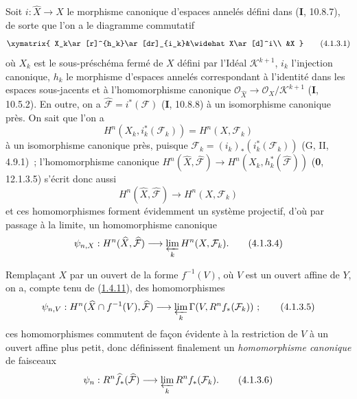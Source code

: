 \begin{env}[4.1.3]
\label{III.4.1.3-fr}
Soit $i:\widehat X\to X$ le morphisme canonique d'espaces annelés défini
dans (\textbf{I}, 10.8.7), de sorte que l'on a le diagramme commutatif
\[
\xymatrix{
X_k\ar[r]^{h_k}\ar[dr]_{i_k}&\widehat X\ar[d]^i\\
&X
}
\tag{4.1.3.1}\label{III.4.1.3.1-fr}
\]
où $X_k$ est le sous-préschéma fermé de $X$ défini par l'Idéal
$\mathcal K^{k+1}$, $i_k$ l'injection canonique, $h_k$ le morphisme
d'espaces annelés correspondant à l'identité dans les espaces sous-jacents
et à l'homomorphisme canonique
$\mathcal O_{\widehat X}\to\mathcal O_X/\mathcal K^{k+1}$ (\textbf{I}, 10.5.2).
En outre, on a $\widehat{\mathcal F}=i^*(\mathcal F)$ (\textbf{I}, 10.8.8) à un
isomorphisme canonique près. On sait que l'on a
\[
H^n(X_k,i_k^*(\mathcal F_k))=H^n(X,\mathcal F_k)
\tag{4.1.3.2}\label{III.4.1.3.2-fr}
\]
à un isomorphisme canonique près, puisque
$\mathcal F_k=(i_k)_*(i_k^*(\mathcal F_k))$ (G, II, 4.9.1)~;
l'homomorphisme canonique
$H^n(\widehat X,\widehat{\mathcal F})\to
H^n(X_k,h_k^*(\widehat{\mathcal F}))$ (\textbf{0}, 12.1.3.5) s'écrit donc aussi
\[
H^n(\widehat X,\widehat{\mathcal F})\longrightarrow H^n(X,\mathcal F_k)
\tag{4.1.3.3}\label{III.4.1.3.3-fr}
\]
et ces homomorphismes forment évidemment un système projectif, d'où par
passage à la limite, un homomorphisme canonique
\[
\psi_{n,X}:H^n(\widehat X,\widehat{\mathcal F})
\longrightarrow\varprojlim_kH^n(X,\mathcal F_k).
\tag{4.1.3.4}\label{III.4.1.3.4-fr}
\]

Remplaçant $X$ par un ouvert de la forme $f^{-1}(V)$, où $V$ est un
ouvert affine de $Y$, on a, compte tenu de
(\hyperref[III.1.4.11-fr]{1.4.11}), des homomorphismes
\[
\psi_{n,V}:H^n(\widehat X\cap f^{-1}(V),\widehat{\mathcal F})
\longrightarrow\varprojlim_k\Gamma(V,R^nf_*(\mathcal F_k))~;
\tag{4.1.3.5}\label{III.4.1.3.5-fr}
\]
ces homomorphismes commutent de façon évidente à la restriction de $V$ à
un ouvert affine plus petit, donc définissent finalement un \emph{homomorphisme
canonique} de faisceaux
\[
\psi_n:R^n\widehat f_*(\widehat{\mathcal F})
\longrightarrow\varprojlim_kR^nf_*(\mathcal F_k).
\tag{4.1.3.6}\label{III.4.1.3.6-fr}
\]
\end{env}

